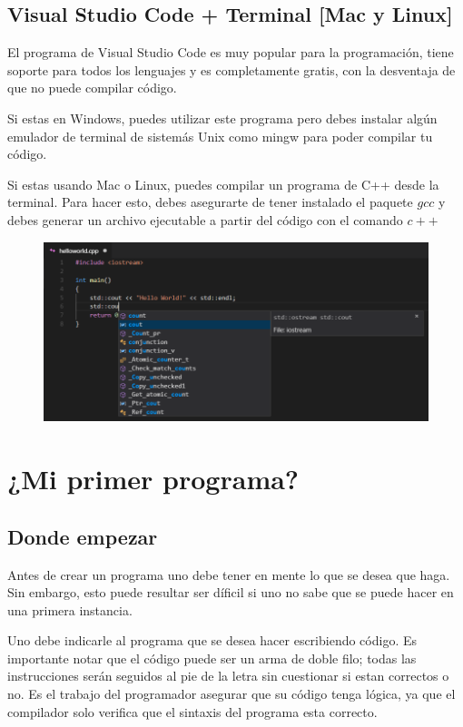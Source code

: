 \documentclass{article}
\begin{document}
\subsection{Visual Studio Code + Terminal [Mac y Linux]}
El programa de Visual Studio Code es muy popular para la programación, tiene soporte para todos los lenguajes y es completamente gratis, con la desventaja de que no puede compilar código.

Si estas en Windows, puedes utilizar este programa pero debes instalar algún emulador de terminal de sistemás Unix como mingw para poder compilar tu código.

Si estas usando Mac o Linux, puedes compilar un programa de C++ desde la terminal. Para hacer esto, debes asegurarte de tener instalado el paquete $gcc$ y debes generar un archivo ejecutable a partir del código con el comando $c++$

\begin{figure}[H]
    \centering
    \includegraphics[width=0.5\paperwidth]{vscode}
\end{figure}

\section{¿Mi primer programa?}

\subsection{Donde empezar}

Antes de crear un programa uno debe tener en mente lo que se desea que haga. Sin embargo, esto puede resultar ser díficil si uno no sabe que se puede hacer en una primera instancia.

Uno debe indicarle al programa que se desea hacer escribiendo código. Es importante notar que el código puede ser un arma de doble filo; todas las instrucciones serán seguidos al pie de la letra sin cuestionar si estan correctos o no. Es el trabajo del programador asegurar que su código tenga lógica, ya que el compilador solo verifica que el sintaxis del programa esta correcto.
\end{document}
